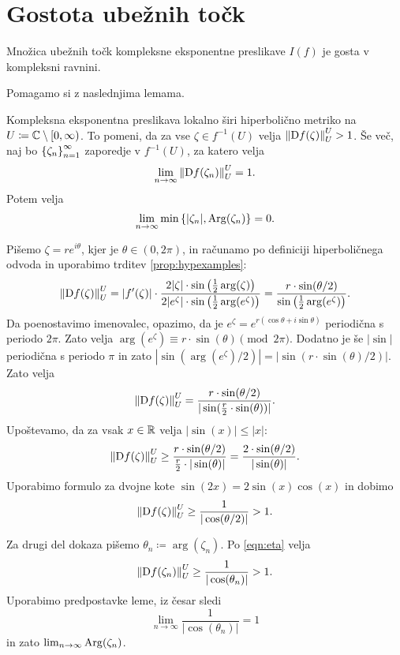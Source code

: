 \section{Gostota ubežnih točk}

\begin{izrek} \label{thm:escapingdense}
    Množica ubežnih točk kompleksne eksponentne preslikave \(I (f)\) je gosta v kompleksni ravnini.
\end{izrek}

\noindent Pomagamo si z naslednjima lemama.

\begin{lema} \label{lem:hyper}
    Kompleksna eksponentna preslikava lokalno širi hiperbolično metriko na \(U \coloneq \mathbb C \setminus [0, \infty)\). To pomeni, da za vse \(\zeta \in f^{-1} (U)\) velja
    \(\left\| \mathrm{D} f (\zeta) \right\|_{U}^{U} > 1\). Še več, naj bo \(\left\{ \zeta_n \right\}_{n = 1}^{\infty}\) zaporedje v \(f^{-1} (U)\), za katero velja \[\lim_{n \to \infty} \left\| \mathrm{D} f (\zeta_n) \right\|_{U}^{U} = 1.\] Potem velja
    \[\lim_{n \to \infty} \min \left\{ |\zeta_n|, \operatorname{Arg} (\zeta_n) \right\} = 0.\]
\end{lema}

\begin{dokaz}
    Pišemo \(\zeta = r e^{i \theta}\), kjer je \(\theta \in (0, 2 \pi)\), in računamo po definiciji hiperboličnega odvoda in uporabimo trditev \ref{prop:hypexamples}:
    \[
        \left\| \mathrm{D} f (\zeta) \right\|_{U}^{U} = |f' (\zeta)| \cdot \frac{2 |\zeta| \cdot \sin \left( \frac{1}{2} \arg (\zeta) \right)}{2 |e^{\zeta}| \cdot \sin \left( \frac{1}{2} \arg (e^{\zeta}) \right)}
        =
        \frac{r \cdot \sin (\theta / 2)}{\sin \left( \frac{1}{2} \arg (e^{\zeta}) \right)}.    
    \]
    Da poenostavimo imenovalec, opazimo, da je \(e^{\zeta} = e^{r (\cos \theta + i \sin \theta)}\) periodična s periodo \(2 \pi\). Zato velja \(\arg (e^{\zeta}) \equiv r \cdot \sin (\theta) \pmod{2 \pi}\). Dodatno je še \(|\sin|\) periodična s periodo \(\pi\) in zato \(|\sin (\arg (e^{\zeta}) / 2)| = |\sin (r \cdot \sin (\theta) / 2)|\). Zato velja
    \[\left\| \mathrm{D} f (\zeta) \right\|_{U}^{U} = \frac{r \cdot \sin (\theta / 2)}{|\sin (\frac{r}{2} \cdot \sin (\theta))|}.\]
    Upoštevamo, da za vsak \(x \in \mathbb R\) velja \(|\sin (x)| \leq |x|\):
    \[\left\| \mathrm{D} f (\zeta) \right\|_{U}^{U} \geq \frac{r \cdot \sin (\theta / 2)}{\frac{r}{2} \cdot |\sin (\theta)|} = \frac{2 \cdot \sin (\theta / 2)}{|\sin (\theta)|}.\]
    Uporabimo formulo za dvojne kote \(\sin (2 x) = 2 \sin (x) \cos (x)\) in dobimo
    \begin{equation} \label{eqn:eta}
        \left\| \mathrm{D} f (\zeta) \right\|_{U}^{U} \geq \frac{1}{|\cos (\theta / 2)|} > 1.
    \end{equation}

    Za drugi del dokaza pišemo \(\theta_n \coloneq \arg (\zeta_n)\). Po \eqref{eqn:eta} velja
    \[\left\| \mathrm{D} f (\zeta_n) \right\|_{U}^{U} \geq \frac{1}{|\cos (\theta_n)|} > 1.\]
    Uporabimo predpostavke leme, iz česar sledi
    \[\lim_{n \to \infty} \frac{1}{|\cos (\theta_n)|} = 1\]
    in zato \(\lim_{n \to \infty} \operatorname{Arg} (\zeta_n)\).
\end{dokaz}

